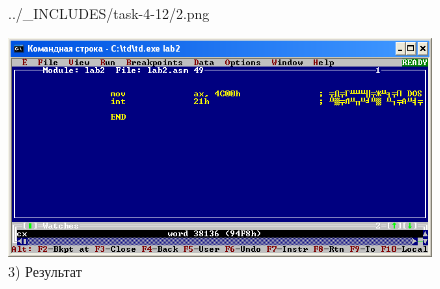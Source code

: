 \begin{figure}[!htp]
\begin {minipage}{0.32\textwidth}
            {../_INCLUDES/task-4-12/2.png}
        \caption{2) Вводим \textbf{cx}}
        \label{fig:task_4_12__2}
    \end{minipage}
    \begin {minipage}{0.32\textwidth}
        \centering
        \includegraphics[width=.99\linewidth]
            {../_INCLUDES/task-4-12/3.png}
        \caption{3) Результат}
        \label{fig:task_4_12__3}
    \end{minipage}
\end{figure}
